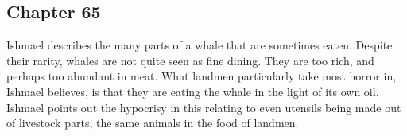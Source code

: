 \subsection{Chapter 65}

Ishmael describes the many parts of a whale that are sometimes eaten. Despite
their rarity, whales are not quite seen as fine dining. They are too rich, and
perhaps too abundant in meat. What landmen particularly take most horror in,
Ishmael believes, is that they are eating the whale in the light of its own
oil. Ishmael points out the hypocrisy in this relating to even utensils being
made out of livestock parts, the same animals in the food of landmen.
